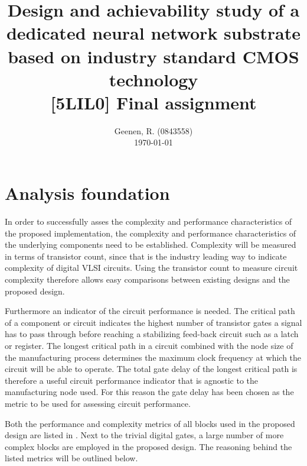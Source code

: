 \documentclass[a4paper, 9pt, conference, onecolumn]{ieeeconf}
\title{\bf
  \LARGE Design and achievability study of a dedicated neural network substrate based on industry standard CMOS technology\\
  \vspace{1ex}
  \large [5LIL0] Final assignment
}
\author{
  Geenen, R. (0843558) \\
  \today
}
\begin{document}
\maketitle


\section{Analysis foundation}
In order to successfully asses the complexity and performance characteristics of the proposed implementation, the complexity and performance characteristics of the underlying components need to be established. Complexity will be measured in terms of transistor count, since that is the industry leading way to indicate complexity of digital \ac{VLSI} circuits. Using the transistor count to measure circuit complexity therefore allows easy comparisons between existing designs and the proposed design.

Furthermore an indicator of the circuit performance is needed. The critical path of a component or circuit indicates the highest number of transistor gates a signal has to pass through before reaching a stabilizing feed-back circuit such as a latch or register. The longest critical path in a circuit combined with the node size of the manufacturing process determines the maximum clock frequency at which the circuit will be able to operate. The total gate delay of the longest critical path is therefore a useful circuit performance indicator that is agnostic to the manufacturing node used. For this reason the gate delay has been chosen as the metric to be used for assessing circuit performance.

Both the performance and complexity metrics of all blocks used in the proposed design are listed in . Next to the trivial digital gates, a large number of more complex blocks are employed in the proposed design. The reasoning behind the listed metrics will be outlined below.
\end{document}
